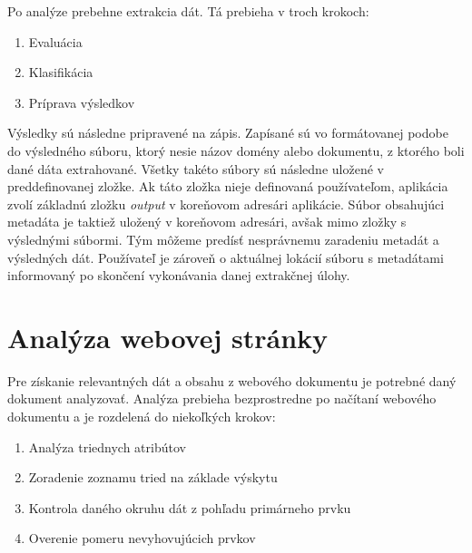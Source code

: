  Po analýze prebehne extrakcia dát. Tá prebieha v troch krokoch:
 
 \begin{enumerate}
     \item Evaluácia
     \item Klasifikácia
     \item Príprava výsledkov
 \end{enumerate}
 
 \bigskip
 
 Výsledky sú následne pripravené na zápis. Zapísané sú vo formátovanej podobe do výsledného súboru, ktorý nesie názov domény alebo dokumentu, z ktorého boli dané dáta extrahované. Všetky takéto súbory sú následne uložené v preddefinovanej zložke. Ak táto zložka nieje definovaná používateľom, aplikácia zvolí základnú zložku \textit{output} v koreňovom adresári aplikácie. Súbor obsahujúci metadáta je taktiež uložený v koreňovom adresári, avšak mimo zložky s výslednými súbormi. Tým môžeme predísť nesprávnemu zaradeniu metadát a výsledných dát. Používateľ je zároveň o aktuálnej lokácií súboru s metadátami informovaný po skončení vykonávania danej extrakčnej úlohy.
 
 \newpage
 \section{Analýza webovej stránky}
 
 Pre získanie relevantných dát a obsahu z webového dokumentu je potrebné daný dokument analyzovať. Analýza prebieha bezprostredne po načítaní webového dokumentu a je rozdelená do niekoľkých krokov:
 
 \begin{enumerate}
     \item Analýza triednych atribútov
     \item Zoradenie zoznamu tried na základe výskytu
     \item Kontrola daného okruhu dát z pohľadu primárneho prvku
     \item Overenie pomeru nevyhovujúcich prvkov
 \end{enumerate}
 
